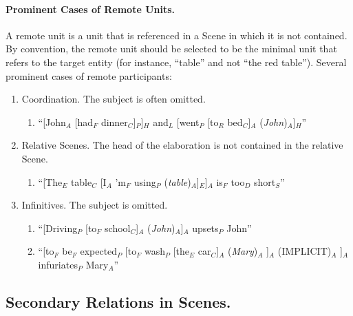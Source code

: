 \documentclass[11pt]{article}
\newcommand{\be}{\begin{enumerate}}
\newcommand{\ee}{\end{enumerate}}
\newcommand{\rem}[1]{{(\it #1})}
\begin{document}
\paragraph{Prominent Cases of Remote Units.} A remote unit is a unit that is referenced in a Scene in which it is not contained. By convention, the remote unit should be selected to be the minimal unit that refers to the target entity (for instance, ``table'' and not ``the red table''). Several prominent cases of remote participants:
\be
\item
Coordination. The subject is often omitted.
\be \item ``[John$_A$ [had$_F$ dinner$_C$]$_P$]$_H$ and$_L$ [went$_P$ [to$_R$ bed$_C$]$_A$ \rem{John}$_A$]$_H$'' \ee
\item
Relative Scenes. The head of the elaboration is not contained in the relative Scene.
\be \item ``[The$_E$ table$_C$ [I$_A$ 'm$_F$ using$_P$ \rem{table}$_A$]$_E$]$_A$ is$_F$ too$_D$ short$_S$'' \ee
\item
Infinitives. The subject is omitted.
\be 
\item ``[Driving$_P$ [to$_F$ school$_C$]$_A$ \rem{John}$_A$]$_A$ upsets$_P$ John'' 

\item ``[to$_F$ be$_F$ expected$_P$ [to$_F$ wash$_P$ [the$_E$ car$_C$]$_A$ \rem{Mary}$_A$ ]$_A$ (IMPLICIT)$_A$ ]$_A$ infuriates$_P$ Mary$_A$''
\ee
\ee

\subsection{Secondary Relations in Scenes.}

\end{document}
